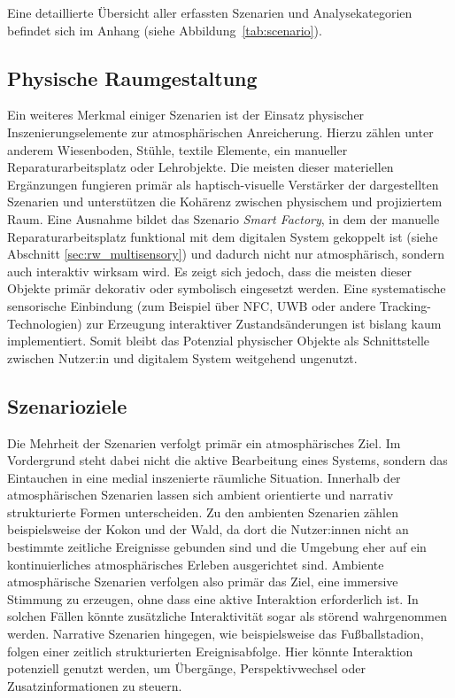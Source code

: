 Eine detaillierte Übersicht aller erfassten Szenarien und Analysekategorien befindet sich im Anhang (siehe Abbildung~\ref{tab:scenario}).


\subsection{Physische Raumgestaltung}
Ein weiteres Merkmal einiger Szenarien ist der Einsatz physischer Inszenierungselemente zur atmosphärischen Anreicherung. Hierzu zählen unter anderem Wiesenboden, Stühle, textile Elemente, ein manueller Reparaturarbeitsplatz  oder Lehrobjekte. Die meisten dieser materiellen Ergänzungen fungieren primär als haptisch-visuelle Verstärker der dargestellten Szenarien und unterstützen die Kohärenz zwischen physischem und projiziertem Raum. Eine Ausnahme bildet das Szenario \textit{Smart Factory}, in dem der manuelle Reparaturarbeitsplatz funktional mit dem digitalen System gekoppelt ist (siehe Abschnitt \ref{sec:rw_multisensory}) und dadurch nicht nur atmosphärisch, sondern auch interaktiv wirksam wird.
Es zeigt sich jedoch, dass die meisten dieser Objekte primär dekorativ oder symbolisch eingesetzt werden. Eine systematische sensorische Einbindung (zum Beispiel über NFC, UWB oder andere Tracking-Technologien) zur Erzeugung interaktiver Zustandsänderungen ist bislang kaum implementiert. Somit bleibt das Potenzial physischer Objekte als Schnittstelle zwischen Nutzer:in und digitalem System weitgehend ungenutzt.


\subsection{Szenarioziele}
Die Mehrheit der Szenarien verfolgt primär ein atmosphärisches Ziel. Im Vordergrund steht dabei nicht die aktive Bearbeitung eines Systems, sondern das Eintauchen in eine medial inszenierte räumliche Situation. Innerhalb der atmosphärischen Szenarien lassen sich ambient orientierte und narrativ strukturierte Formen unterscheiden. Zu den ambienten Szenarien zählen beispielsweise der Kokon und der Wald, da dort die Nutzer:innen nicht an bestimmte zeitliche Ereignisse gebunden sind und die Umgebung eher auf ein kontinuierliches atmosphärisches Erleben ausgerichtet sind. Ambiente atmosphärische Szenarien verfolgen also primär das Ziel, eine immersive Stimmung zu erzeugen, ohne dass eine aktive Interaktion erforderlich ist. In solchen Fällen könnte zusätzliche Interaktivität sogar als störend wahrgenommen werden. Narrative Szenarien hingegen, wie beispielsweise das Fußballstadion, folgen einer zeitlich strukturierten Ereignisabfolge. Hier könnte Interaktion potenziell genutzt werden, um Übergänge, Perspektivwechsel oder Zusatzinformationen zu steuern.


